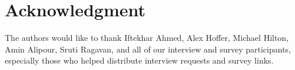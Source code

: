 \section*{Acknowledgment}

The authors would like to thank Iftekhar Ahmed, Alex Hoffer, Michael Hilton, Amin Alipour, Sruti Ragavan, and all of our interview and survey participants, especially those who helped distribute interview requests and survey links.
